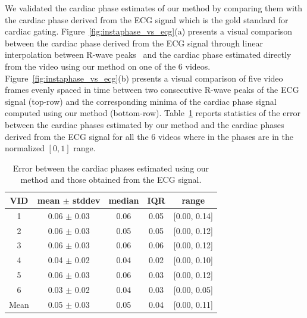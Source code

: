 \documentclass[journal]{IEEEtran}
\begin{document}
We validated the cardiac phase estimates of our method by comparing them with the cardiac phase derived from the ECG signal which is the gold standard for cardiac gating. Figure~\ref{fig:instaphase_vs_ecg}(a) presents a visual comparison between the cardiac phase derived from the ECG signal through linear interpolation between R-wave peaks~\cite{Rosenblum2001,Freund2003} and the cardiac phase estimated directly from the video using our method on one of the 6 videos. Figure~\ref{fig:instaphase_vs_ecg}(b) presents a visual comparison of five video frames evenly spaced in time between two consecutive R-wave peaks of the ECG signal (top-row) and the corresponding minima of the cardiac phase signal computed using our method (bottom-row). Table~\ref{table:phase_estimation_error} reports statistics of the error between the cardiac phases estimated by our method and the cardiac phases derived from the ECG signal for all the 6 videos where in the phases are in the normalized $[0, 1]$ range. 
%
\begin{table}[h]
\begin{minipage}[t]{0.95\linewidth}
\centering
\caption{Error between the cardiac phases estimated using our method and those obtained from the ECG signal.}
\begin{tabular}{|c|c|c|c|c|}
\hline
VID & mean $\pm$ stddev & median & IQR & range \\ \hline
1 & 0.06 $\pm$ 0.03 & 0.06 & 0.05 & {[}0.00, 0.14{]} \\ \hline
2 & 0.06 $\pm$ 0.03 & 0.05 & 0.05 & {[}0.00, 0.12{]} \\ \hline
3 & 0.06 $\pm$ 0.03 & 0.06 & 0.06 & {[}0.00, 0.12{]} \\ \hline
4 & 0.04 $\pm$ 0.02 & 0.04 & 0.02 & {[}0.00, 0.10{]} \\ \hline
5 & 0.06 $\pm$ 0.03 & 0.06 & 0.03 & {[}0.00, 0.12{]} \\ \hline
6 & 0.03 $\pm$ 0.02 & 0.04 & 0.03 & {[}0.00, 0.05{]} \\ \hline \hline
Mean & 0.05 $\pm$ 0.03 & 0.05 & 0.04 & {[}0.00, 0.11{]} \\ \hline
\end{tabular}
\label{table:phase_estimation_error}
\end{minipage}
\end{table}	
%	
	
\end{document}
